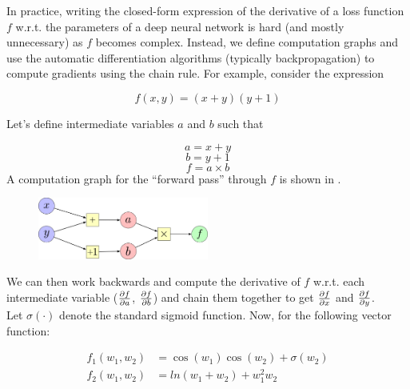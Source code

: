 
In practice, writing the closed-form expression of the derivative of
a loss function $f$ w.r.t. the parameters of a deep neural network is hard
(and mostly unnecessary) as $f$ becomes complex. Instead, we define
computation graphs and use the automatic differentiation algorithms (typically backpropagation) to compute
gradients using the chain rule. For example, consider the expression

\begin{equation}
f(x, y) = (x+y)(y+1)
\end{equation}

Let's define intermediate variables $a$ and $b$ such that

\begin{equation}
a = x + y
\end{equation}
%
\begin{equation}
b = y + 1
\end{equation}
%
\begin{equation}
f = a \times b
\end{equation}
A computation graph for the ``forward pass'' through $f$ is shown in . 

\begin{figure}[h]
  \centering
    \includegraphics[width=0.5\textwidth]{assets/comp_graph_example.jpg}
    \caption{}
    \label{fig:graph}
\end{figure}

We can then work backwards and compute the derivative of $f$ w.r.t. each
intermediate variable ($\frac{\partial f}{\partial a}$, $\frac{\partial f}{\partial b}$) and
chain them together to get $\frac{\partial f}{\partial x}$ and $\frac{\partial f}{\partial y}$. \\

Let $\sigma(\cdot)$ denote the standard sigmoid function. Now, for the following vector function:

\begin{align}
f_1(w_1, w_2) &= \cos(w_1)\cos(w_2) + \sigma(w_2) \\
f_2(w_1, w_2) &= ln(w_1 + w_2) + w_1^2 w_2
\end{align}

